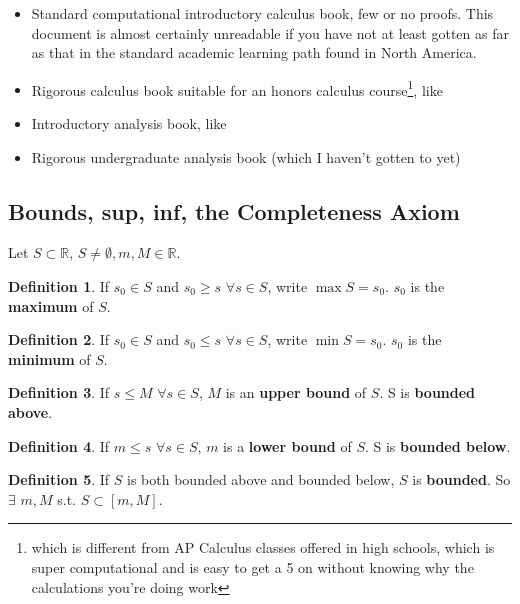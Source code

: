 \documentclass{article}
\theoremstyle{definition}
\newtheorem{definition}{Definition}[section]
\begin{document}
\begin{itemize}
\item Standard computational introductory calculus book, few or no proofs. This document is almost certainly unreadable if you have not at least gotten as far as that in the standard academic learning path found in North America.
\item Rigorous calculus book suitable for an honors calculus course\footnote{which is different from AP Calculus classes offered in high schools, which is super computational and is easy to get a 5 on without knowing why the calculations you're doing work}, like \cite{spivak}
\item Introductory analysis book, like \cite{ross}
\item Rigorous undergraduate analysis book (which I haven't gotten to yet)
\end{itemize}

\subsection{Bounds, sup, inf, the Completeness Axiom}

Let $S \subset \mathbb{R}$, $S \neq \emptyset, m, M \in \mathbb{R}$. 

\begin{definition}
If $s_0 \in S$ and $s_0 \ge s$ $\forall s \in S$, write $\max S = s_0$. $s_0$ is the \textbf{maximum} of $S$.
\end{definition}

\begin{definition}
If $s_0 \in S$ and $s_0 \le s$ $\forall s \in S$, write $\min S = s_0$. $s_0$ is the \textbf{minimum} of $S$.
\end{definition}

\begin{definition}
If $s \leq M$ $\forall s \in S$, $M$ is an \textbf{upper bound} of $S$. S is \textbf{bounded above}.
\end{definition}

\begin{definition}
If $m \leq s$ $\forall s \in S$, $m$ is a \textbf{lower bound} of $S$. S is \textbf{bounded below}.
\end{definition}

\begin{definition}
If $S$ is both bounded above and bounded below, $S$ is \textbf{bounded}. So $\exists$ $m, M$ s.t. $S \subset [m, M]$.
\end{definition}
\end{document}
